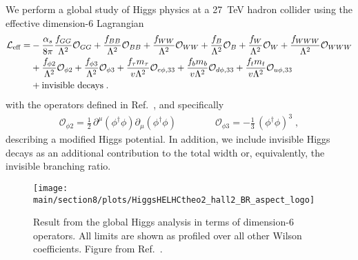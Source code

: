 We perform a global study of Higgs physics at a 27~TeV hadron collider
using the effective dimension-6 Lagrangian~\cite{Brivio:2017vri} 
\begin{align}
\mathcal{L}_\text{eff} 
= & - \frac{\alpha_s }{8 \pi} \frac{f_{GG}}{\Lambda^2} \mathcal{O}_{GG}  
    + \frac{f_{BB}}{\Lambda^2} \mathcal{O}_{BB} 
    + \frac{f_{WW}}{\Lambda^2} \mathcal{O}_{WW} 
    + \frac{f_B}{\Lambda^2} \mathcal{O}_B 
    + \frac{f_W}{\Lambda^2} \mathcal{O}_W 
    + \frac{f_{WWW}}{\Lambda^2} \mathcal{O}_{WWW} \notag \\ 
  &  + \frac{f_{\phi 2}}{\Lambda^2} \mathcal{O}_{\phi 2} 
    + \frac{f_{\phi 3}}{\Lambda^2} \mathcal{O}_{\phi 3} 
    + \frac{f_\tau m_\tau}{v \Lambda^2} \mathcal{O}_{e\phi,33} 
    + \frac{f_b m_b}{v \Lambda^2} \mathcal{O}_{d\phi,33} 
    + \frac{f_t m_t}{v \Lambda^2} \mathcal{O}_{u\phi,33} \notag \\
  & + \text{invisible decays} \; .
\label{eq:ourleff}
\end{align}
%
with the operators defined in Ref.~\cite{Butter:2016cvz}, 
and specifically
%
\begin{align}
\mathcal{O}_{\phi 2} = \frac{1}{2} \, \partial^\mu (\phi^\dagger \phi) \partial_\mu (\phi^\dagger \phi)  
\qquad \qquad
\mathcal{O}_{\phi 3} = -\frac{1}{3} \, (\phi^\dagger \phi)^3 \; ,
\label{eq:ope23}
\end{align}
%
describing a modified Higgs potential. In addition, we include invisible 
Higgs decays as an additional contribution to the total width or, equivalently, 
the invisible branching ratio.
\begin{figure}[b!]
\centering
\texttt{[image: \\main/section8/plots/HiggsHELHCtheo2\_hall2\_BR\_aspect\_logo]}
\caption{Result from the global Higgs analysis in terms of dimension-6
  operators. All limits are shown as profiled over all other Wilson
  coefficients. Figure from Ref.~\cite{Biekotter:2018jzu}.}
\label{fig:d6}
\end{figure}


